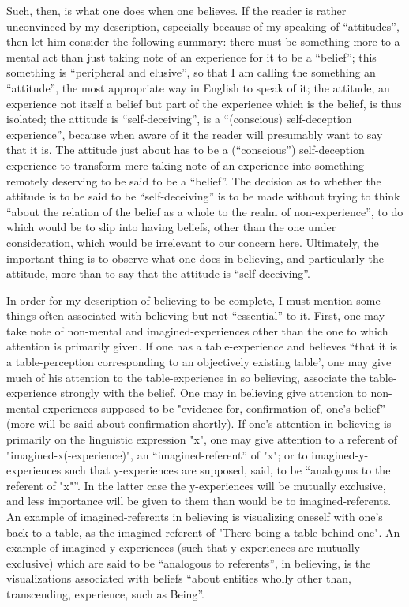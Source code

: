 Such, then, is what one does when one believes. If the reader is rather 
unconvinced by my description, especially because of my speaking of 
\enquote{attitudes}, then let him consider the following summary: there must be 
something more to a mental act than just taking note of an experience for it 
to be a \enquote{belief}; this something is \enquote{peripheral and elusive}, so that I am 
calling the something an \enquote{attitude}, the most appropriate way in English to 
speak of it; the attitude, an experience not itself a belief but part of the 
experience which is the belief, is thus isolated; the attitude is 
\enquote{self-deceiving}, is a \enquote{(conscious) self-deception experience}, because when 
aware of it the reader will presumably want to say that it is. The attitude just 
about has to be a (\enquote{conscious}) self-deception experience to transform mere 
taking note of an experience into something remotely deserving to be said to 
be a \enquote{belief}. The decision as to whether the attitude is to be said to be 
\enquote{self-deceiving} is to be made without trying to think \enquote{about the relation of 
the belief as a whole to the realm of non-experience}, to do which would be 
to slip into having beliefs, other than the one under consideration, which 
would be irrelevant to our concern here. Ultimately, the important thing is 
to observe what one does in believing, and particularly the attitude, more 
than to say that the attitude is \enquote{self-deceiving}. 

In order for my description of believing to be complete, I must mention 
some things often associated with believing but not \enquote{essential} to it. First, 
one may take note of non-mental and imagined-experiences other than the 
one to which attention is primarily given. If one has a table-experience and 
believes \enquote{that it is a table-perception corresponding to an objectively existing 
table', one may give much of his attention to the table-experience in so 
believing, associate the table-experience strongly with the belief. One may in 
believing give attention to non-mental experiences supposed to be "evidence 
for, confirmation of, one's belief} (more will be said about confirmation 
shortly). If one's attention in believing is primarily on the linguistic 
expression "x", one may give attention to a referent of 
"imagined-x(-experience)", an \enquote{imagined-referent} of "x"; or to 
imagined-y-experiences such that y-experiences are supposed, said, to be 
\enquote{analogous to the referent of "x"}. In the latter case the y-experiences will be 
mutually exclusive, and less importance will be given to them than would be 
to imagined-referents. An example of imagined-referents in believing is 
visualizing oneself with one's back to a table, as the imagined-referent of 
"There being a table behind one". An example of imagined-y-experiences 
(such that y-experiences are mutually exclusive) which are said to be 
\enquote{analogous to referents}, in believing, is the visualizations associated with 
beliefs \enquote{about entities wholly other than, transcending, experience, such as 
Being}. 


